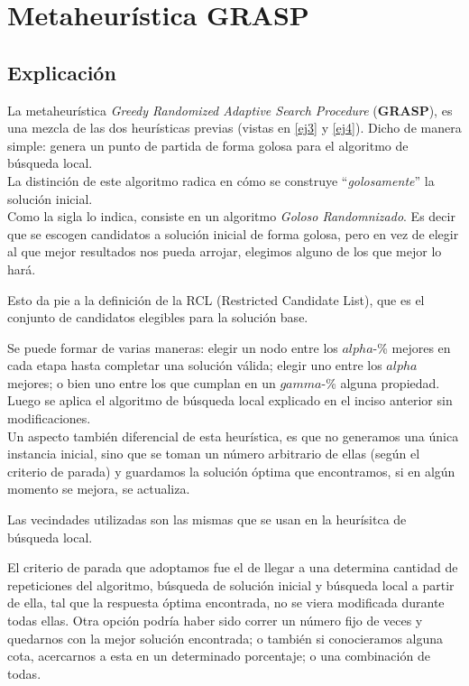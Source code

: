 \section{Metaheur\'istica GRASP}
\subsection{Explicaci\'on}
La metaheur\'istica \emph{Greedy Randomized Adaptive Search Procedure} (\textbf{GRASP}), es una mezcla de las dos heur\'isticas previas (vistas en \ref{ej3} y \ref{ej4}). Dicho de manera simple: genera un punto de partida de forma golosa para el algoritmo de b\'usqueda local.\\

La distinci\'on de este algoritmo radica en cómo se construye ``\textit{golosamente}'' la soluci\'on inicial.\\

Como la sigla lo indica, consiste en un algoritmo \textit{Goloso Randomnizado}. Es decir que se escogen candidatos a soluci\'on inicial de forma golosa, pero en vez de elegir al que mejor resultados nos pueda arrojar, elegimos alguno de los que mejor lo har\'a.

Esto da pie a la definici\'on de la RCL (Restricted Candidate List), que es el conjunto de candidatos elegibles para la soluci\'on base.

Se puede formar de varias maneras: elegir un nodo entre los $alpha$-\% mejores en cada etapa hasta completar una soluci\'on v\'alida; elegir uno entre los $alpha$ mejores; o bien uno entre los que cumplan en un $gamma$-\% alguna propiedad.\\

Luego se aplica el algoritmo de b\'usqueda local explicado en el inciso anterior sin modificaciones.\\

Un aspecto tambi\'en diferencial de esta heur\'istica, es que no generamos una \'unica instancia inicial, sino que se toman un n\'umero arbitrario de ellas (seg\'un el criterio de parada) y guardamos la soluci\'on \'optima que encontramos, si en alg\'un momento se mejora, se actualiza.

Las vecindades utilizadas son las mismas que se usan en la heur\'isitca de b\'usqueda local.

El criterio de parada que adoptamos fue el de llegar a una determina cantidad de repeticiones del algoritmo, b\'usqueda de soluci\'on inicial y b\'usqueda local a partir de ella, tal que la respuesta \'optima encontrada, no se viera modificada durante todas ellas. Otra opci\'on podr\'ia haber sido correr un n\'umero fijo de veces y quedarnos con la mejor soluci\'on encontrada; o tambi\'en si conocieramos alguna cota, acercarnos a esta en un determinado porcentaje; o una combinaci\'on de todas.

